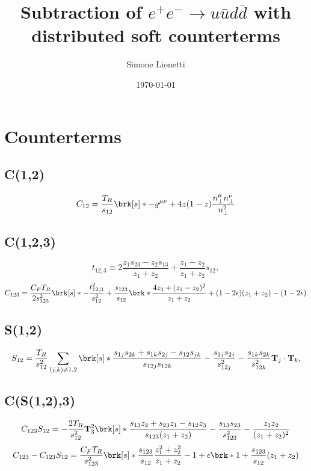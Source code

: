 \documentclass[11pt,a4paper]{article}
\title{Subtraction of $e^+e^- \to u\bar{u}d\bar{d}$
with distributed soft counterterms}
\author{Simone Lionetti}
\date{\today}
\newcommand{\eps}[0]{\epsilon}
\newcommand{\colorT}[1]{\mathbf{T}_{#1}}
\begin{document}
\maketitle

\section{Counterterms}

\subsection{C(1,2)}

\begin{equation}
	C_{12} = \frac{T_R}{s_{12}} \brk[s]*{
		- g^{\mu\nu}
		+ 4 z (1-z) \frac{n_\perp^\mu n_\perp^\nu}{n_\perp^2}
	}
\end{equation}


\subsection{C(1,2,3)}

\begin{equation}
	t_{12,3}
	\equiv 2 \frac{z_1 s_{23} - z_2 s_{13}}{z_1 + z_2}
	+ \frac{z_1 - z_2}{z_1 + z_2} s_{12},
\end{equation}
\begin{equation}
	C_{123} = \frac{C_F T_R}{2 s_{123}^2} \brk[s]*{
		- \frac{t_{12,3}^2}{s_{12}^2}
		+ \frac{s_{123}}{s_{12}} \brk*{
			\frac{4 z_3 + (z_1 - z_2)^2}{z_1 + z_2}
			+(1 - 2\eps)(z_1 + z_2)
		}
		- (1 - 2\eps)
	}
\end{equation}


\subsection{S(1,2)}

\begin{equation}
	S_{12} = \frac{T_R}{s_{12}^2} \sum_{(j,k) \ne 1,2}
	\brk[s]*{
		\frac{s_{1j}s_{2k} + s_{1k}s_{2j} - s_{12}s_{jk}}{s_{12j} s_{12k}}
		- \frac{s_{1j}s_{2j}}{s_{12j}^2} - \frac{s_{1k}s_{2k}}{s_{12k}^2}
	} \colorT{j}\cdot\colorT{k},
\end{equation}


\subsection{C(S(1,2),3)}

\begin{equation}
	C_{123}S_{12} = - \frac{2T_R}{s_{12}^2} \colorT{3}^2
	\brk[s]*{
		\frac{s_{13} z_2 + s_{23} z_1 - s_{12} z_3}{s_{123} (z_1+z_2)}
		- \frac{s_{13}s_{23}}{s_{123}^2} - \frac{z_1 z_2}{(z_1+z_2)^2}
	}
\end{equation}
\begin{equation}
	C_{123} - C_{123}S_{12} = \frac{C_F T_R}{s_{123}^2} \brk[s]*{
		\frac{s_{123}}{s_{12}} \frac{z_1^2 + z_2^2}{z_1+z_2} - 1
		+ \eps \brk*{1 + \frac{s_{123}}{s_{12}} (z_1+z_2) }
	}
\end{equation}
\end{document}
